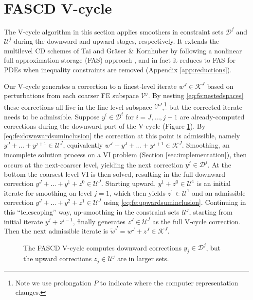 \documentclass[letterpaper,final,12pt,reqno]{amsart}
\theoremstyle{cstyle}
\theoremstyle{cstyle*}
\theoremstyle{dstyle}
\numberwithin{equation}{section}
\numberwithin{figure}{section}
\numberwithin{table}{section}
\numberwithin{theorem}{section}
\begin{document}
\section{FASCD V-cycle} \label{sec:vcycle}

The V-cycle algorithm in this section applies smoothers in constraint sets $\mathcal{D}^j$ and $\mathcal{U}^j$ during the downward and upward stages, respectively.  It extends the multilevel CD schemes of Tai \cite{Tai2003} and Gr\"aser \& Kornhuber \cite[Algorithm 4.7]{GraeserKornhuber2009} by following a nonlinear full approximation storage (FAS) approach \cite{BrandtLivne2011}, and in fact it reduces to FAS for PDEs when inequality constraints are removed (Appendix \ref{app:reductions}).

Our V-cycle generates a correction to a finest-level iterate $w^J \in \mathcal{K}^J$ based on perturbations from each coarser FE subspace $\mathcal{V}^j$.  By nesting \eqref{eq:fe:nestedspaces} these corrections all live in the fine-level subspace $\mathcal{V}^J$,\footnote{Note we use prolongation $P$ to indicate where the computer representation changes.} but the corrected iterate needs to be admissible.  Suppose $y^i \in \mathcal{D}^i$ for $i=J,\dots,j-1$ are already-computed corrections during the downward part of the V-cycle (Figure \ref{fig:fascdvcycle}).  By \eqref{eq:fe:downwardsuminclusion} the correction at this point is admissible, namely $y^J + \dots + y^{j+1} \in \mathcal{U}^J$, equivalently $w^J + y^J + \dots + y^{j+1} \in \mathcal{K}^J$.  Smoothing, an incomplete solution process on a VI problem (Section \ref{sec:implementation}), then occurs at the next-coarser level, yielding the next correction $y^j \in \mathcal{D}^j$.  At the bottom the coarsest-level VI is then solved, resulting in the full downward correction $y^J + \dots + y^1 + z^0 \in \mathcal{U}^J$.  Starting upward, $y^1 + z^0 \in \mathcal{U}^1$ is an initial iterate for smoothing on level $j=1$, which then yields $z^1 \in \mathcal{U}^1$ and an admissible correction $y^J + \dots + y^2 + z^1 \in \mathcal{U}^J$ using \eqref{eq:fe:upwardsuminclusion}.  Continuing in this ``telescoping'' way, up-smoothing in the constraint sets $\mathcal{U}^j$, starting from initial iterate $y^j+z^{j-1}$, finally generates $z^J\in \mathcal{U}^J$ as the full V-cycle correction.  Then the next admissible iterate is $\tilde{w}^J = w^J + z^J \in \mathcal{K}^J$.

\begin{figure}[ht]
\begin{center}

\end{center}
\caption{The FASCD V-cycle computes downward corrections $y_j \in \mathcal{D}^j$, but the upward corrections $z_j\in\mathcal{U}^j$ are in larger sets.}
\label{fig:fascdvcycle}
\end{figure}
\end{document}
